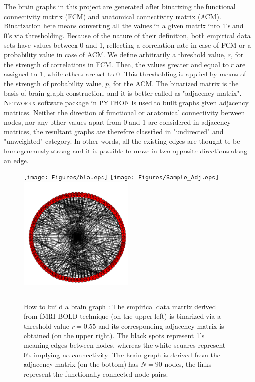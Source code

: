 The brain graphs in this project are generated after binarizing the functional connectivity matrix (FCM) and anatomical connectivity matrix (ACM). Binarization here means converting all the values in a given matrix into 1's and 0's via thresholding. Because of the nature of their definition, both empirical data sets have values between 0 and 1, reflecting a correlation rate in case of FCM or a probability value in case of ACM. We define arbitrarily a threshold value, $r$, for the strength of correlations in FCM. Then, the values greater and equal to $r$ are assigned to 1, while others are set to 0. This thresholding is applied by means of the strength of probability value, $p$, for the ACM. The binarized matrix is the basis of brain graph construction, and it is better called as "adjacency matrix". \textsc{Networkx} software package in \textsc{PYTHON} is used to built graphs given adjacency matrices. Neither the direction of functional or anatomical connectivity between nodes, nor any other values apart from 0 and 1  are considered in adjacency matrices, the resultant graphs are therefore classified in "undirected" and "unweighted" category. In other words, all the existing edges are thought to be homogeneously strong and it is possible to move in two opposite directions along an edge. 

\begin{figure}[htbp]
  \centering
	 \texttt{[image: Figures/bla.eps]} 
	 \texttt{[image: Figures/Sample\_Adj.eps]} 
	 \includegraphics[width=0.50\textwidth]{Figures/brain_graph.png}  
  
    
    \rule{35em}{0.5pt}
  \caption[Binarizing via thresholding]{How to build a brain graph : The empirical data matrix derived from fMRI-BOLD technique (on the upper left) is binarized via a threshold value $r=0.55$ and its corresponding adjacency matrix is obtained (on the upper right). The black spots represent 1's meaning edges between nodes, whereas the white squares represent 0's implying no connectivity. The brain graph is derived from the adjacency matrix (on the bottom) has $N=90$ nodes, the links represent the functionally connected node pairs.}
  \label{fig:Electron}
\end{figure}

